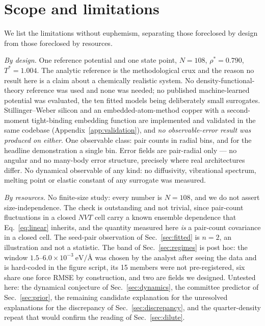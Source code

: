 \documentclass[aip,jcp,reprint,amsmath,amssymb,floatfix]{revtex4-2}
\newcommand{\eVA}{\ensuremath{\mathrm{eV}/\text{\AA}}}
\begin{document}
\section{Scope and limitations}
\label{sec:scope}

We list the limitations without euphemism, separating those foreclosed by design
from those foreclosed by resources.

\emph{By design.} One reference potential and one state
point, $N = 108$, $\rho^* = 0.790$, $T^* = 1.004$. The analytic
reference is the methodological crux and the
reason no result here is a claim about a chemically realistic system. No
density-functional-theory reference was used and none was needed; no published
machine-learned potential was evaluated, the ten fitted models being deliberately
small surrogates. Stillinger--Weber
silicon\cite{StillingerWeber1985} and an embedded-atom-method
copper\cite{DawBaskes1984} with a second-moment tight-binding embedding
function\cite{FinnisSinclair1984, CleriRosato1993} are implemented and validated
in the same codebase (Appendix~\ref{app:validation}), and \emph{no
observable-error result was produced on either}. One observable class: pair
counts in radial bins, and for the headline demonstration a single bin.
Error fields are pair-radial only --- no angular and no many-body error
structure, precisely where real architectures differ. No dynamical
observable of any kind: no diffusivity, vibrational spectrum,
melting point or elastic constant of any surrogate was measured.

\emph{By resources.} No finite-size study: every number is $N = 108$, and we do
not assert size-independence. The check is
outstanding and not trivial, since pair-count fluctuations in a
closed $NVT$ cell carry a known ensemble dependence\cite{LebowitzPercusVerlet1967}
that Eq.~\eqref{eq:linear} inherits, and the quantity
measured here \emph{is} a pair-count covariance in a closed cell. The seed-pair
observation of Sec.~\ref{sec:fitted} is $n = 2$, an
illustration and not a statistic. The band of Sec.~\ref{sec:regimes} is post hoc:
the window $1.5$--$6.0\times10^{-3}~\eVA$ was chosen by the analyst after
seeing the data and is hard-coded in the figure script, its 15 members
were not pre-registered, six share one force RMSE by
construction, and two are fields we designed. Untested here: the dynamical
conjecture of Sec.~\ref{sec:dynamics}, the committee predictor of
Sec.~\ref{sec:prior}, the remaining candidate explanation for
the unresolved explanations for the discrepancy of
Sec.~\ref{sec:discrepancy}, and the quarter-density
repeat that would confirm the reading of Sec.~\ref{sec:dilute}.
\end{document}
